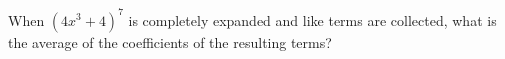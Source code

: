When $(4x^3+4)^7$ is completely expanded and like terms are collected, what is the average of the coefficients of the resulting terms?
